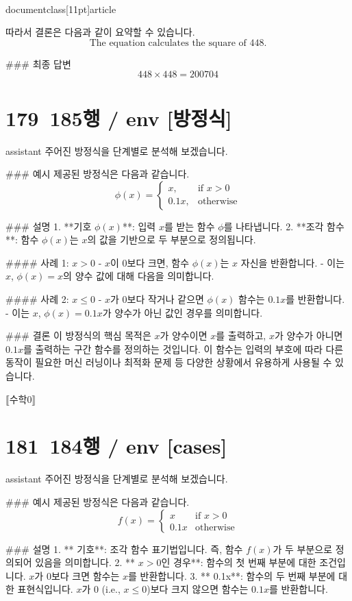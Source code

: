 \\documentclass[11pt]{article}
\begin{document}
따라서 결론은 다음과 같이 요약할 수 있습니다.
\[ \text{The equation calculates the square of 448.} \]

### 최종 답변
\[
\boxed{448 \times 448 = 200704}
\]

\section*{179~185행 / env [방정식]}
assistant
주어진 방정식을 단계별로 분석해 보겠습니다.

### 예시
제공된 방정식은 다음과 같습니다.
\[
\phi(x) =
\begin{cases}
    x, & \text{if } x > 0\\
    0.1x, & \text{otherwise}
\end{cases}
\]

### 설명
1. **기호 \(\phi(x)\)**: 입력 \(x\)를 받는 함수 \(\phi\)를 나타냅니다.
2. **조각 함수**: 함수 \(\phi(x)\)는 \(x\)의 값을 기반으로 두 부분으로 정의됩니다.

#### 사례 1: \(x > 0\)
- \(x\)이 0보다 크면, 함수 \(\phi(x)\)는 \(x\) 자신을 반환합니다.
- 이는 \(x\), \(\phi(x) = x\)의 양수 값에 대해 다음을 의미합니다.

#### 사례 2: \(x \leq 0\)
- \(x\)가 0보다 작거나 같으면 \(\phi(x)\) 함수는 \(0.1x\)를 반환합니다.
- 이는 \(x\), \(\phi(x) = 0.1x\)가 양수가 아닌 값인 경우를 의미합니다.

### 결론
이 방정식의 핵심 목적은 \(x\)가 양수이면 \(x\)를 출력하고, \(x\)가 양수가 아니면 \(0.1x\)를 출력하는 구간 함수를 정의하는 것입니다. 이 함수는 입력의 부호에 따라 다른 동작이 필요한 머신 러닝이나 최적화 문제 등 다양한 상황에서 유용하게 사용될 수 있습니다.

⟦수학0⟧

\section*{181~184행 / env [cases]}
assistant
주어진 방정식을 단계별로 분석해 보겠습니다.

### 예시
제공된 방정식은 다음과 같습니다.
\[ f(x) = \begin{cases} 
x & \text{if } x > 0 \\
0.1x & \text{otherwise}
\end{cases} \]

### 설명
1. ** 기호**: 조각 함수 표기법입니다. 즉, 함수 \( f(x) \)가 두 부분으로 정의되어 있음을 의미합니다.
2. ** \( x > 0 \)인 경우**: 함수의 첫 번째 부분에 대한 조건입니다. \( x \)가 0보다 크면 함수는 \( x \)를 반환합니다.
3. ** 0.1x**: 함수의 두 번째 부분에 대한 표현식입니다. \( x \)가 0 (i.e., \( x \leq 0 \))보다 크지 않으면 함수는 \( 0.1x \)를 반환합니다.
\end{document}

